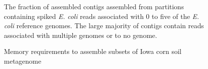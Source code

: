 \documentclass[11pt]{article} %
\begin{document}
\begin{figure}[ht]
\caption{The fraction of assembled contigs assembled from partitions
  containing spiked \emph{E. coli} reads associated with 0 to five of
  the \emph{E. coli} reference genomes.  The large majority of contigs
  contain reads associated with multiple genomes or to no genome.}
\label{fractionassembled}
\end{figure}



\begin{figure}[ht]
\caption{Memory requirements to assemble subsets of Iowa corn soil
  metagenome}
\label{memory}
\end{figure}
\end{document}

